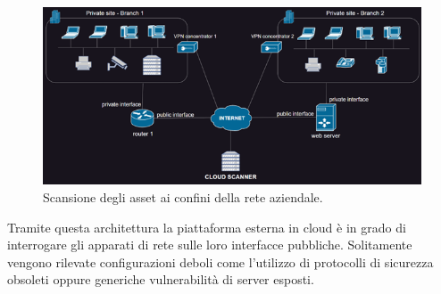 \documentclass[target=mst,aauheader=]{thud}
\begin{document}

\begin{figure}[h]
\label{fig:scan_esterna}
\centering
\includegraphics[scale=1.2]{images/scan_esterna.png}
    \caption{Scansione degli asset ai confini della rete aziendale.}
\end{figure}


Tramite questa architettura la piattaforma esterna in cloud è in grado di interrogare gli apparati di rete sulle loro interfacce pubbliche. Solitamente vengono rilevate configurazioni deboli come l’utilizzo di protocolli di sicurezza obsoleti oppure generiche vulnerabilità di server esposti.
\end{document}
